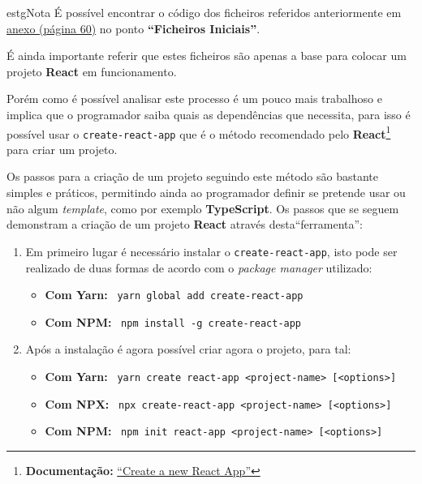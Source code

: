 \begin{enumerate}
	\vspace{0.25cm}
	\begin{mybox}{estg}{Nota}
		É possível encontrar o código dos ficheiros referidos anteriormente em \underline{{\hyperref[reactFiles]{anexo {\footnotesize(página 60)}}}} no ponto \textbf{``Ficheiros Iniciais''}.

		É ainda importante referir que estes ficheiros são apenas a base para colocar um projeto \textbf{React} em funcionamento.
	\end{mybox}
\end{enumerate}

Porém como é possível analisar este processo é um pouco mais trabalhoso e implica que o programador saiba quais as dependências que necessita, para isso é possível usar o \texttt{create-react-app} que é o método recomendado pelo \textbf{React}\footnote{\textbf{Documentação:} \href{https://reactjs.org/docs/create-a-new-react-app.html}{``Create a new React App''}} para criar um projeto.

Os passos para a criação de um projeto seguindo este método são bastante simples e práticos, permitindo ainda ao programador definir se pretende usar ou não algum \textit{template}, como por exemplo \textbf{TypeScript}. Os passos que se seguem demonstram a criação de um projeto \textbf{React} através desta``ferramenta'':

\begin{enumerate}
	\item Em primeiro lugar é necessário instalar o \texttt{create-react-app}, isto pode ser realizado de duas formas de acordo com o \textit{package manager} utilizado:
	\begin{itemize}
		\item \textbf{Com Yarn:} ~\texttt{yarn global add create-react-app}
		\item \textbf{Com NPM:} ~\texttt{npm install -g create-react-app}
	\end{itemize}
	\item Após a instalação é agora possível criar agora o projeto, para tal:
	\begin{itemize}
		\item \textbf{Com Yarn:} ~\texttt{yarn create react-app <project-name> [<options>]}
		\item \textbf{Com NPX:} ~\texttt{npx create-react-app <project-name> [<options>]}
		\item \textbf{Com NPM:} ~\texttt{npm init react-app <project-name> [<options>]}
	\end{itemize}
\end{enumerate}

